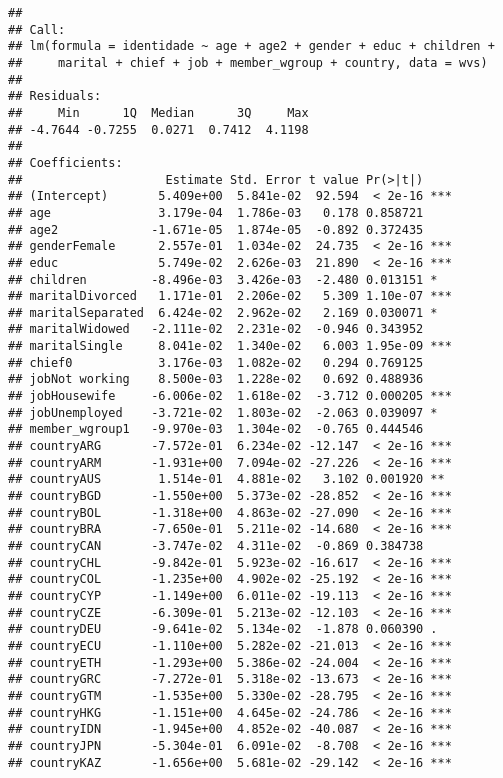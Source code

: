 \documentclass[
]{article}
\begin{document}
\begin{verbatim}
## 
## Call:
## lm(formula = identidade ~ age + age2 + gender + educ + children + 
##     marital + chief + job + member_wgroup + country, data = wvs)
## 
## Residuals:
##     Min      1Q  Median      3Q     Max 
## -4.7644 -0.7255  0.0271  0.7412  4.1198 
## 
## Coefficients:
##                    Estimate Std. Error t value Pr(>|t|)    
## (Intercept)       5.409e+00  5.841e-02  92.594  < 2e-16 ***
## age               3.179e-04  1.786e-03   0.178 0.858721    
## age2             -1.671e-05  1.874e-05  -0.892 0.372435    
## genderFemale      2.557e-01  1.034e-02  24.735  < 2e-16 ***
## educ              5.749e-02  2.626e-03  21.890  < 2e-16 ***
## children         -8.496e-03  3.426e-03  -2.480 0.013151 *  
## maritalDivorced   1.171e-01  2.206e-02   5.309 1.10e-07 ***
## maritalSeparated  6.424e-02  2.962e-02   2.169 0.030071 *  
## maritalWidowed   -2.111e-02  2.231e-02  -0.946 0.343952    
## maritalSingle     8.041e-02  1.340e-02   6.003 1.95e-09 ***
## chief0            3.176e-03  1.082e-02   0.294 0.769125    
## jobNot working    8.500e-03  1.228e-02   0.692 0.488936    
## jobHousewife     -6.006e-02  1.618e-02  -3.712 0.000205 ***
## jobUnemployed    -3.721e-02  1.803e-02  -2.063 0.039097 *  
## member_wgroup1   -9.970e-03  1.304e-02  -0.765 0.444546    
## countryARG       -7.572e-01  6.234e-02 -12.147  < 2e-16 ***
## countryARM       -1.931e+00  7.094e-02 -27.226  < 2e-16 ***
## countryAUS        1.514e-01  4.881e-02   3.102 0.001920 ** 
## countryBGD       -1.550e+00  5.373e-02 -28.852  < 2e-16 ***
## countryBOL       -1.318e+00  4.863e-02 -27.090  < 2e-16 ***
## countryBRA       -7.650e-01  5.211e-02 -14.680  < 2e-16 ***
## countryCAN       -3.747e-02  4.311e-02  -0.869 0.384738    
## countryCHL       -9.842e-01  5.923e-02 -16.617  < 2e-16 ***
## countryCOL       -1.235e+00  4.902e-02 -25.192  < 2e-16 ***
## countryCYP       -1.149e+00  6.011e-02 -19.113  < 2e-16 ***
## countryCZE       -6.309e-01  5.213e-02 -12.103  < 2e-16 ***
## countryDEU       -9.641e-02  5.134e-02  -1.878 0.060390 .  
## countryECU       -1.110e+00  5.282e-02 -21.013  < 2e-16 ***
## countryETH       -1.293e+00  5.386e-02 -24.004  < 2e-16 ***
## countryGRC       -7.272e-01  5.318e-02 -13.673  < 2e-16 ***
## countryGTM       -1.535e+00  5.330e-02 -28.795  < 2e-16 ***
## countryHKG       -1.151e+00  4.645e-02 -24.786  < 2e-16 ***
## countryIDN       -1.945e+00  4.852e-02 -40.087  < 2e-16 ***
## countryJPN       -5.304e-01  6.091e-02  -8.708  < 2e-16 ***
## countryKAZ       -1.656e+00  5.681e-02 -29.142  < 2e-16 ***

\end{verbatim}
\end{document}
